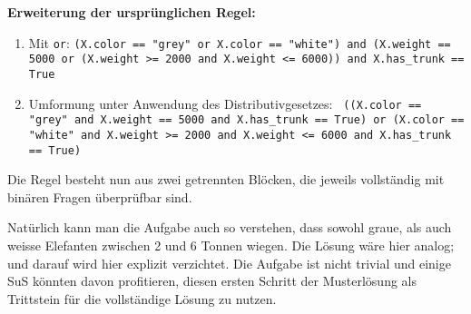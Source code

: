 \begin{aufgabe}{2}
\textbf{Erweiterung der ursprünglichen Regel:}

\begin{enumerate}
\item Mit \texttt{or}: \texttt{(X.color == "grey"\ or X.color == "white") and (X.weight == 5000 or (X.weight >= 2000 and X.weight <= 6000)) and X.has\_trunk == True}

\item Umformung unter Anwendung des Distributivgesetzes: \texttt{
((X.color == "grey"\ and X.weight == 5000 and X.has\_trunk == True)\
or (X.color == "white" and X.weight >= 2000 and X.weight <= 6000 and X.has\_trunk == True)
}
\end{enumerate}

Die Regel besteht nun aus zwei getrennten Blöcken, die jeweils vollständig mit binären Fragen überprüfbar sind.
\end{aufgabe}

Natürlich kann man die Aufgabe auch so verstehen, dass sowohl graue, als auch weisse Elefanten zwischen 2 und 6 Tonnen wiegen. Die Lösung wäre hier analog; und darauf wird hier explizit verzichtet. Die Aufgabe ist nicht trivial und einige SuS könnten davon profitieren, diesen ersten Schritt der Musterlösung als Trittstein für die vollständige Lösung zu nutzen.

